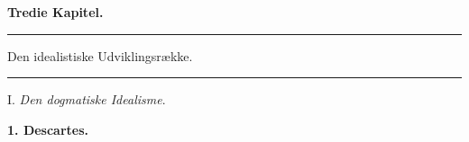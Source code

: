 \documentclass[12pt,a4paper]{book}
\newcommand{\divrule}{\begin{center}\rule{2cm}{0.4pt}\end{center}}
\begin{document}
%

\begin{center}
  \textbf{Tredie Kapitel.}
\end{center}

\divrule

\begin{center}
  {\large Den idealistiske Udviklingsrække.}
\end{center}

\divrule

\begin{center}
  I. \emph{Den dogmatiske Idealisme}.
\end{center}

\begin{center}
  \textbf{1. Descartes.}
\end{center}
\end{document}
